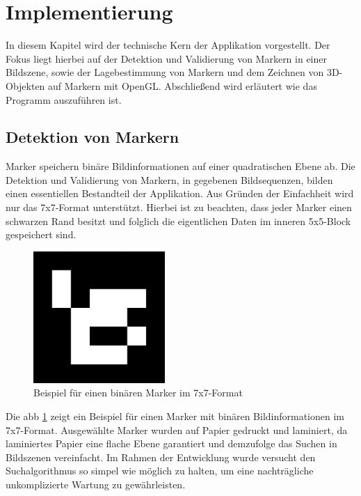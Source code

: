 
\section{Implementierung}
In diesem Kapitel wird der technische Kern der Applikation vorgestellt. Der Fokus liegt hierbei auf der Detektion und Validierung von Markern in einer Bildszene, sowie der Lagebestimmung von Markern und dem Zeichnen von 3D-Objekten auf Markern mit OpenGL. Abschließend wird erläutert wie das Programm auszuführen ist.

\subsection{Detektion von Markern}\label{ssec:detectionmarker}
Marker speichern binäre Bildinformationen auf einer quadratischen Ebene ab. Die Detektion und Validierung von Markern, in gegebenen Bildsequenzen, bilden einen essentiellen Bestandteil der Applikation. Aus Gründen der Einfachheit wird nur das 7x7-Format unterstützt. Hierbei ist zu beachten, dass jeder Marker einen schwarzen Rand besitzt und folglich die eigentlichen Daten im inneren 5x5-Block gespeichert sind.

\begin{figure}[H]
\centering
\includegraphics[width=5cm]{Bilder/Implementierung/marker1.jpg}
\caption{Beispiel für einen binären Marker im 7x7-Format}
\label{fig:MarkerExample}
\end{figure}

\noindent Die \acs{abb} \ref{fig:MarkerExample} zeigt ein Beispiel für einen Marker mit binären Bildinformationen im 7x7-Format. Ausgewählte Marker wurden auf Papier gedruckt und laminiert, da laminiertes Papier eine flache Ebene garantiert und demzufolge das Suchen in Bildszenen vereinfacht. Im Rahmen der Entwicklung wurde versucht den Suchalgorithmus so simpel wie möglich zu halten, um eine nachträgliche unkomplizierte Wartung zu gewährleisten.

